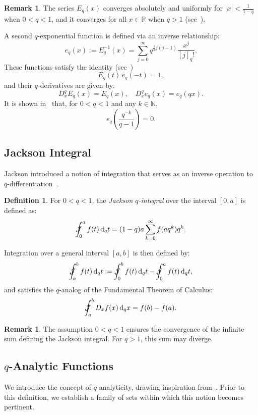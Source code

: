 \documentclass[10pt]{amsart}
\theoremstyle{plain}
\theoremstyle{definition}
\newtheorem{definition}[theorem]{Definition}
\newtheorem{remark}[theorem]{Remark}
\newcommand{\Jint}{\mathcal{J}\mspace{-20mu}\int  }
\begin{document}
\begin{remark}
The series $ E_q(x) $ converges absolutely and uniformly for $ |x| < \frac{1}{1 - q} $ when $ 0 < q < 1 $, and it converges for all $ x \in \mathbb{R} $ when $ q > 1 $ (see~\cite[Section 6.8]{Ernst2012}).
\end{remark}

A second $q$-exponential function is defined via an inverse relationship:
\[
e_q(x) := E_q^{-1}(x) = \sum_{j=0}^{\infty} q^{\frac{1}{2}j(j-1)} \frac{x^j}{[j]_q!}.
\]
These functions satisfy the identity (see~\cite{CoSo2010})
\[
E_q(t)\, e_q(-t) = 1,
\]
and their $q$-derivatives are given by:
\[
D_x^{q} E_q(x) = E_q(x), \quad D_x^{q} e_q(x) = e_q(qx).
\]
It is shown in~\cite[Lemma 11]{CoSo2010} that, for $ 0 < q < 1 $ and any $ k \in \mathbb{N} $,
\begin{equation}\label{convexp}
e_q\left( \frac{q^{-k}}{q - 1} \right) = 0.
\end{equation}



\subsection{Jackson Integral}%
Jackson introduced a notion of integration that serves as an inverse operation to $q$-differentiation~\cite{Jackson1910}.
\begin{definition}
For $ 0 < q < 1 $, the \textit{Jackson $q$-integral} over the interval $ [0, a] $ is defined as:
\[
\Jint_0^a f(t)\, \mathrm{d}_q t = (1 - q) a \sum_{k=0}^{\infty} f(a q^k) q^k.
\]
\end{definition}
Integration over a general interval $ [a, b] $ is then defined by:
\[
\Jint_a^b f(t)\, \mathrm{d}_q t := \Jint_0^b f(t)\, \mathrm{d}_q t - \Jint_0^a f(t)\, \mathrm{d}_q t,
\]
and satisfies the $q$-analog of the Fundamental Theorem of Calculus:
\[
\Jint_a^b D_x f(x)\, \mathrm{d}_q x = f(b) - f(a).
\]

\begin{remark}
The assumption $ 0 < q < 1 $ ensures the convergence of the infinite sum defining the Jackson integral. For $ q > 1 $, this sum may diverge.
\end{remark}


\subsection{$q$-Analytic Functions}
We introduce the concept of $q$-analyticity, drawing inspiration from~\cite{Pashaev2014,Turner2016}.
Prior to this definition, we establish a family of sets within which this notion becomes pertinent.
\end{document}
